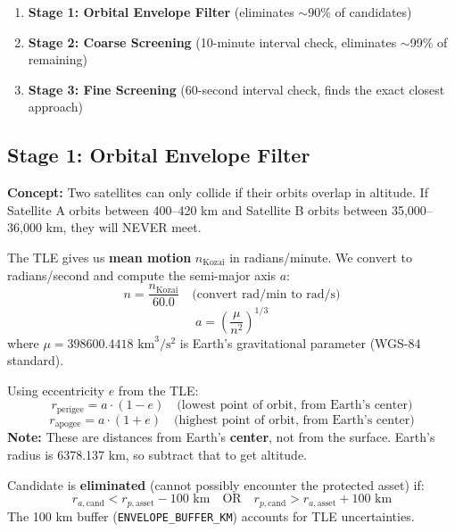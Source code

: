 \documentclass[12pt,a4paper]{article}
\begin{document}
\begin{enumerate}
    \item \textbf{Stage 1: Orbital Envelope Filter} (eliminates $\sim$90\% of candidates)
    \item \textbf{Stage 2: Coarse Screening} (10-minute interval check, eliminates $\sim$99\% of remaining)
    \item \textbf{Stage 3: Fine Screening} (60-second interval check, finds the exact closest approach)
\end{enumerate}

\subsection{Stage 1: Orbital Envelope Filter}

\textbf{Concept:} Two satellites can only collide if their orbits overlap in altitude. If Satellite A orbits between 400--420 km and Satellite B orbits between 35,000--36,000 km, they will NEVER meet.

\begin{formulabox}[title=Formula: Semi-Major Axis from Mean Motion]
The TLE gives us \textbf{mean motion} $n_{\text{Kozai}}$ in radians/minute. We convert to radians/second and compute the semi-major axis $a$:
\[
n = \frac{n_{\text{Kozai}}}{60.0} \quad \text{(convert rad/min to rad/s)}
\]
\[
a = \left(\frac{\mu}{n^2}\right)^{1/3}
\]
where $\mu = 398600.4418 \text{ km}^3/\text{s}^2$ is Earth's gravitational parameter (WGS-84 standard).
\end{formulabox}

\begin{formulabox}[title=Formula: Perigee and Apogee Radii]
Using eccentricity $e$ from the TLE:
\[
r_{\text{perigee}} = a \cdot (1 - e) \quad \text{(lowest point of orbit, from Earth's center)}
\]
\[
r_{\text{apogee}} = a \cdot (1 + e) \quad \text{(highest point of orbit, from Earth's center)}
\]
\textbf{Note:} These are distances from Earth's \textbf{center}, not from the surface. Earth's radius is 6378.137 km, so subtract that to get altitude.
\end{formulabox}

\begin{formulabox}[title=Formula: Overlap Condition]
Candidate is \textbf{eliminated} (cannot possibly encounter the protected asset) if:
\[
r_{a,\text{cand}} < r_{p,\text{asset}} - 100\text{ km} \quad \text{OR} \quad r_{p,\text{cand}} > r_{a,\text{asset}} + 100\text{ km}
\]
The 100 km buffer (\texttt{ENVELOPE\_BUFFER\_KM}) accounts for TLE uncertainties.
\end{formulabox}
\end{document}
